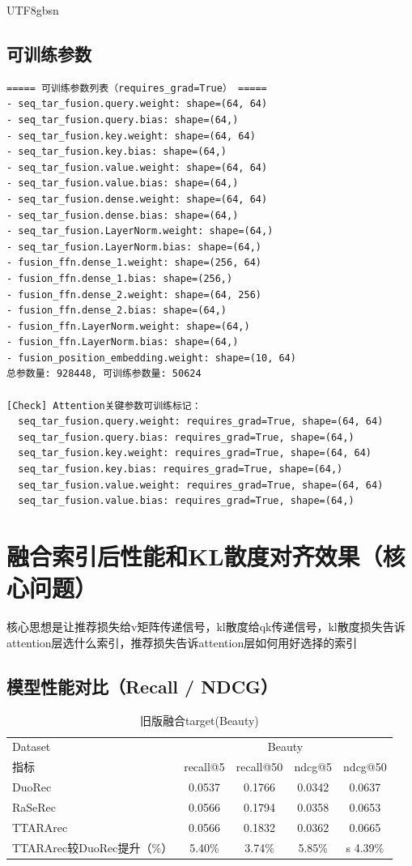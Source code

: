 \documentclass[12pt,a4paper]{article}
\begin{document}
\begin{CJK}{UTF8}{gbsn}
\subsection{可训练参数}
\begin{verbatim}
===== 可训练参数列表（requires_grad=True） =====
- seq_tar_fusion.query.weight: shape=(64, 64)
- seq_tar_fusion.query.bias: shape=(64,)
- seq_tar_fusion.key.weight: shape=(64, 64)
- seq_tar_fusion.key.bias: shape=(64,)
- seq_tar_fusion.value.weight: shape=(64, 64)
- seq_tar_fusion.value.bias: shape=(64,)
- seq_tar_fusion.dense.weight: shape=(64, 64)
- seq_tar_fusion.dense.bias: shape=(64,)
- seq_tar_fusion.LayerNorm.weight: shape=(64,)
- seq_tar_fusion.LayerNorm.bias: shape=(64,)
- fusion_ffn.dense_1.weight: shape=(256, 64)
- fusion_ffn.dense_1.bias: shape=(256,)
- fusion_ffn.dense_2.weight: shape=(64, 256)
- fusion_ffn.dense_2.bias: shape=(64,)
- fusion_ffn.LayerNorm.weight: shape=(64,)
- fusion_ffn.LayerNorm.bias: shape=(64,)
- fusion_position_embedding.weight: shape=(10, 64)
总参数量: 928448, 可训练参数量: 50624

[Check] Attention关键参数可训练标记：
  seq_tar_fusion.query.weight: requires_grad=True, shape=(64, 64)
  seq_tar_fusion.query.bias: requires_grad=True, shape=(64,)
  seq_tar_fusion.key.weight: requires_grad=True, shape=(64, 64)
  seq_tar_fusion.key.bias: requires_grad=True, shape=(64,)
  seq_tar_fusion.value.weight: requires_grad=True, shape=(64, 64)
  seq_tar_fusion.value.bias: requires_grad=True, shape=(64,)

\end{verbatim}

\section{融合索引后性能和KL散度对齐效果（核心问题）}

核心思想是让推荐损失给v矩阵传递信号，kl散度给qk传递信号，kl散度损失告诉attention层选什么索引，推荐损失告诉attention层如何用好选择的索引


\subsection{模型性能对比（Recall / NDCG）}
\begin{table}[H]
\centering
\caption{旧版融合target(Beauty)}
\begin{tabular}{lcccc}
\toprule
\midrule
Dataset & \multicolumn{4}{c}{Beauty} \\
指标 & recall@5 & recall@50 & ndcg@5 & ndcg@50 \\
DuoRec & 0.0537 & 0.1766 & 0.0342 & 0.0637 \\
RaSeRec & 0.0566 & 0.1794 & 0.0358 & 0.0653 \\
TTARArec & 0.0566 & 0.1832 & 0.0362 & 0.0665 \\
TTARArec较DuoRec提升（\%） & 5.40\% & 3.74\% & 5.85\% &s 4.39\% \\
\bottomrule
\end{tabular}
\label{tab:beauty_compare_metrics}
\end{table}


\end{CJK}
\end{document}
